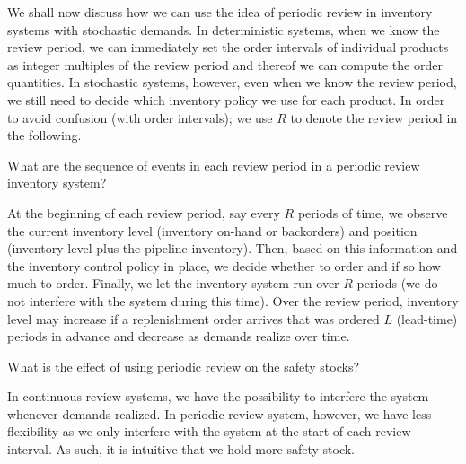 We shall now discuss how we can use the idea of periodic review in inventory systems with stochastic demands. In deterministic systems, when we know the review period, we can immediately set the order intervals of individual products as integer multiples of the review period and thereof we can compute the order quantities. In stochastic systems, however, even when we know the review period, we still need to decide which inventory policy we use for each product. In order to avoid confusion (with order intervals); we use $R$ to denote the review period in the following.

\begin{exercise}
What are the sequence of events in each review period in a periodic review inventory system?


\begin{solution}
At the beginning of each review period, say every $R$ periods of time, we observe the current inventory level (inventory on-hand or backorders) and position (inventory level plus the pipeline inventory). Then, based on this information and the inventory control policy in place, we decide whether to order and if so how much to order. Finally, we let the inventory system run over $R$ periods (we do not interfere with the system during this time). Over the review period, inventory level may increase if a replenishment order arrives that was ordered $L$ (lead-time) periods in advance and decrease as demands realize over time. 
\end{solution}
\end{exercise}

\begin{exercise}
What is the effect of using periodic review on the safety stocks?


\begin{solution}
In continuous review systems, we have the possibility to interfere the system whenever demands realized. In periodic review system, however, we have less flexibility as we only interfere with the system at the start of each review interval. As such, it is intuitive that we hold more safety stock.
\end{solution}
\end{exercise}

